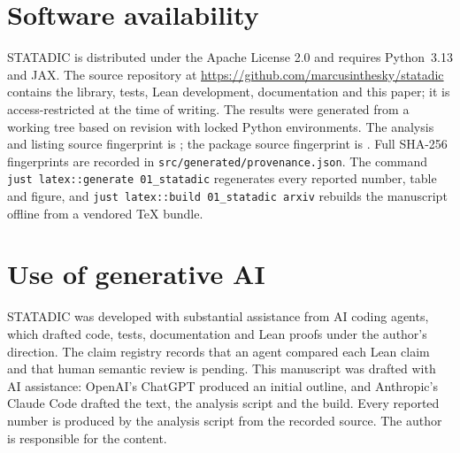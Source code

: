 \section*{Software availability}

STATADIC  is distributed under the Apache License 2.0 and
requires Python~3.13 and JAX. The source repository at
\url{https://github.com/marcusinthesky/statadic} contains the library, tests, Lean
development, documentation and this paper; it is access-restricted at the time
of writing. The results were generated from a working tree based on revision
\texttt{} with locked Python environments. The analysis and
listing source fingerprint is \texttt{}; the
package source
fingerprint is \texttt{}. Full SHA-256 fingerprints are
recorded in \texttt{src/generated/provenance.json}. The command
\texttt{just latex::generate 01\_statadic} regenerates every reported number, table
and figure, and \texttt{just latex::build 01\_statadic arxiv} rebuilds the
manuscript offline from a vendored TeX bundle.

\section*{Use of generative AI}

STATADIC was developed with substantial assistance from AI coding agents, which
drafted code, tests, documentation and Lean proofs under the author's
direction. The claim registry records that an agent compared each Lean
claim and that human semantic review is pending. This manuscript was
drafted with AI assistance: OpenAI's ChatGPT
produced an initial outline, and Anthropic's Claude Code drafted the text, the
analysis script and the build. Every reported number is produced by the
analysis script from the recorded source. The author is responsible for the
content.
